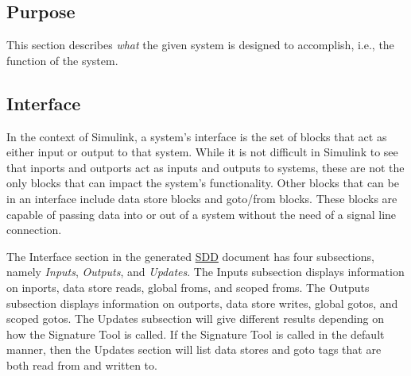 \documentclass{mcscert}
\newcommand{\simulink}{Simulink}
\newcommand{\sigtool}{Signature Tool}
\newcommand{\topsystemnolink}{Top-System} %
\newcommand{\topsystem}{\hyperref[def:topsystem]{\topsystemnolink{}}}
\begin{document}
  
    \subsection{Purpose} \label{ssec:purpose-description}
    This section describes \emph{what} the given system is designed to accomplish, i.e., the function of the system. 

    \subsection{Interface} 
    \label{ssec:interface-description}
    
In the context of \simulink{}, a system's interface is the set of blocks that act as either input or output to that system. 
While it is not difficult in \simulink{} to see that inports and outports act as inputs and outputs to systems, these are not the only blocks that can impact the system's functionality. 
Other blocks that can be in an interface include data store blocks and goto/from blocks. 
These blocks are capable of passing data into or out of a system without the need of a signal line connection.

The Interface section in the generated \hyperref[acr:sdd]{SDD} document has four subsections, namely \emph{Inputs}, \emph{Outputs}, and \emph{Updates}. 
The Inputs
subsection displays information on inports, data store reads, global froms, and scoped froms. 
The Outputs subsection displays information on outports, data store writes, global gotos, and scoped gotos. 
The Updates subsection will give different results depending on how the \sigtool{} is called. 
If the \sigtool{} is called in the default manner, then the Updates section will list data stores and goto tags that are both read from and written to. 
\end{document}

